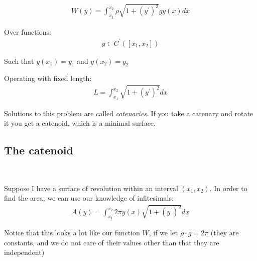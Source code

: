 \begin{equation*}
  \begin{gathered}
    W(y) = \int_{x_1}^{x_2} \rho\sqrt{1+(y^{\prime})^2}gy(x) dx
  \end{gathered}
\end{equation*}
\par\bigskip
\noindent Over functions:
\begin{equation*}
  \begin{gathered}
    y\in C^{\prime}([x_1,x_2])
  \end{gathered}
\end{equation*}\par
\noindent Such that $y(x_1) = y_1$ and $y(x_2)=y_2$\par
\noindent Operating with fixed length:
\begin{equation*}
  \begin{gathered}
    L = \int_{x_1}^{x_2}\sqrt{1+(y^{\prime})^2}dx
  \end{gathered}
\end{equation*}
\par\bigskip
\noindent Solutions to this problem are called \textit{catenaries}. If you take a catenary and rotate it you get a catenoid, which is a minimal surface.
\par\bigskip
\subsection{The catenoid}\hfill\\\par
\noindent Suppose I have a surface of revolution within an interval $(x_1,x_2)$. In order to find the area, we can use our knowledge of infitesimals:
\begin{equation*}
  \begin{gathered}
    A(y) = \int_{x_1}^{x_2}2\pi y(x)\sqrt{1+(y^{\prime})^2}dx
  \end{gathered}
\end{equation*}
\par\bigskip
\noindent Notice that this looks a lot like our function $W$, if we let $\rho\cdot g = 2\pi$ (they are constants, and we do not care of their values other than that they are independent) 
\par\bigskip

